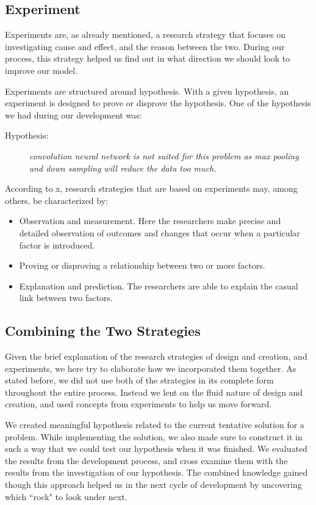 \subsection{Experiment}
Experiments are, as already mentioned, a research strategy that focuses on investigating cause and effect, and the reason between the two. During our process, this strategy helped us find out in what direction we should look to improve our model.

Experiments are structured around hypothesis. With a given hypothesis, an experiment is designed to prove or disprove the hypothesis. One of the hypothesis we had during our development was:

\begin{description}
    \item[Hypothesis:]{\textit{convolution neural network is not suited for this problem as max pooling and down sampling will reduce the data too much.}}
\end{description}

According to x, research strategies that are based on experiments may, among others, be characterized by:

\begin{itemize}
    \item Observation and measurement. Here the researchers make precise and detailed observation of outcomes and changes that occur when a particular factor is introduced.
    \item Proving or disproving a relationship between two or more factors.
    \item Explanation and prediction. The researchers are able to explain the casual link between two factors.
\end{itemize}

\subsection{Combining the Two Strategies}
Given the brief explanation of the research strategies of design and creation, and experiments, we here try to elaborate how we incorporated them together. As stated before, we did not use both of the strategies in its complete form throughout the entire process. Instead we lent on the fluid nature of design and creation, and used concepts from experiments to help us move forward. 

We created meaningful hypothesis related to the current tentative solution for a problem. While implementing the solution, we also made sure to construct it in such a way that we could test our hypothesis when it was finished. We evaluated the results from the development process, and cross examine them with the results from the investigation of our hypothesis. The combined knowledge gained though this approach helped us in the next cycle of development by uncovering which ``rock" to look under next.

